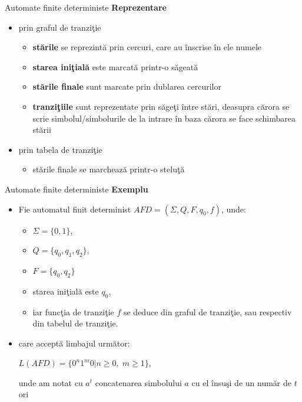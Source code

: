 \documentclass[pdf]{beamer}
\begin{document}
\begin{frame}{Automate finite deterministe}
\textbf{Reprezentare}
\begin{itemize}
\item
prin graful de tranziţie
\begin{itemize}
\item
\textbf{stările} se reprezintă prin cercuri, care au înscrise în ele numele
\item
\textbf{starea iniţială} este marcată printr-o săgeată
\item
\textbf{stările finale} sunt marcate prin dublarea cercurilor
\item
\textbf{tranziţiile} sunt reprezentate prin săgeţi între stări, deasupra cărora se scrie simbolul/simbolurile de la intrare în baza cărora se face schimbarea stării
\end{itemize}
\item
prin tabela de tranziţie
\begin{itemize}
\item
stările finale se marchează printr-o steluţă
\end{itemize}
\end{itemize}
\end{frame}



\begin{frame}{Automate finite deterministe}
\textbf{Exemplu}
\begin{itemize}
\item
Fie automatul finit determinist $AFD=(\Sigma, Q, F, q_{0}, f)$, unde:

\begin{itemize}
\item
$\Sigma = \{ 0, 1 \}$,
\item
$Q = \{ q_{0}, q_{1}, q_{2} \}$,
\item
$F=\{ q_{0}, q_{2} \}$
\item
starea iniţială este $q_{0}$,
\item
iar funcţia de tranziţie $f$ se deduce din graful de tranziţie, sau respectiv din tabelul de tranziţie.
\end{itemize}
\item
care acceptă limbajul următor:

$L(AFD) = \{ 0^{n}1^{m}0 | n \geq 0, \; m \geq 1 \}$, 

unde am notat cu $a^{t}$ concatenarea simbolului $a$ cu el însuşi de un număr de $t$ ori
\end{itemize}
\end{frame}
\end{document}
